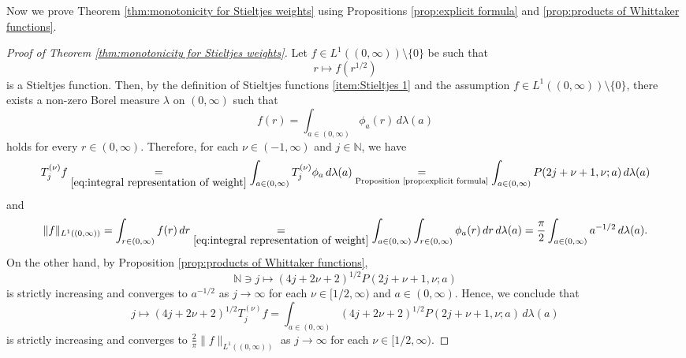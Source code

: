 \documentclass[reqno]{amsart}
\theoremstyle{plain}
\numberwithin{equation}{section}
\theoremstyle{remark}
\newcommand{\N}{\mathbb{N}}
\newcommand{\intervaloo}[2]{(#1, #2)}
\newcommand{\intervalco}[2]{[#1, #2)}
\newcommand{\norm}[1]{\lVert#1\rVert}
\newcommand{\Tjnuf}[3]{T_{#1}^{(#2)}#3}
\newcommand{\weightphia}[1]{\phi_{#1}}
\newcommand{\Productmna}[3]{P(#1,#2;#3)}
\begin{document}
Now we prove Theorem \ref{thm:monotonicity for Stieltjes weights} using Propositions \ref{prop:explicit formula} and \ref{prop:products of Whittaker functions}.
\begin{proof}[Proof of Theorem \ref{thm:monotonicity for Stieltjes weights}]
Let $f \in L^1(\intervaloo{0}{\infty}) \setminus \{0\}$ be such that 
\begin{equation}
	r \longmapsto f(r^{1/2})
\end{equation}
is a Stieltjes function. 
Then, by the definition of Stieltjes functions \ref{item:Stieltjes 1} and the assumption $f \in L^1(\intervaloo{0}{\infty}) \setminus \{0\}$, 
there exists a non-zero Borel measure $\lambda$ on $\intervaloo{0}{\infty}$ such that
\begin{equation} \label{eq:integral representation of weight}
	f(r) = \int_{a \in \intervaloo{0}{\infty}} \weightphia{a}(r) \, d\lambda(a)
\end{equation}
holds for every $r \in \intervaloo{0}{\infty}$.
Therefore, for each $\nu \in \intervaloo{-1}{\infty}$ and $j \in \N$, we have
\begin{equation} \label{eq:formula for Tjnu}
\Tjnuf{j}{\nu}{f} 
\underset{\eqref{eq:integral representation of weight}}{=} \int_{a \in \intervaloo{0}{\infty}} \Tjnuf{j}{\nu}{\weightphia{a}} \, d\lambda(a) 
\underset{\text{Proposition \ref{prop:explicit formula}}}{=} \int_{a \in \intervaloo{0}{\infty}} \Productmna{2j + \nu + 1}{\nu}{a} \, d\lambda(a)
\end{equation}
and 
\begin{equation} \label{eq:formula for L1 norm}
\norm{f}_{L^1(\intervaloo{0}{\infty})} = \int_{r \in \intervaloo{0}{\infty}} f(r) \, dr \underset{\eqref{eq:integral representation of weight}}{=} \int_{a \in \intervaloo{0}{\infty}} \int_{r \in \intervaloo{0}{\infty}} \weightphia{a}(r) \, dr \, d\lambda(a) = \frac{\pi}{2} \int_{a \in \intervaloo{0}{\infty}} a^{-1/2} \, d\lambda(a) .
\end{equation}
On the other hand, by Proposition \ref{prop:products of Whittaker functions}, 
\begin{equation}
\N \ni j \longmapsto (4j+2\nu+2)^{1/2} \Productmna{2j + \nu + 1}{\nu}{a}
\end{equation}
is strictly increasing and converges to $a^{-1/2}$ as $j \to \infty$ for each $\nu \in \intervalco{1/2}{\infty}$ and $a \in \intervaloo{0}{\infty}$.
Hence, we conclude that 
\begin{equation}
j \longmapsto (4j+2\nu+2)^{1/2} \Tjnuf{j}{\nu}{f} = \int_{a \in \intervaloo{0}{\infty}} (4j+2\nu+2)^{1/2} \Productmna{2j + \nu + 1}{\nu}{a} \, d\lambda(a)
\end{equation}
is strictly increasing and converges to $\frac{2}{\pi} \norm{f}_{L^1(\intervaloo{0}{\infty})}$ as $j \to \infty$ for each $\nu \in \intervalco{1/2}{\infty}$.
\end{proof}
\end{document}
